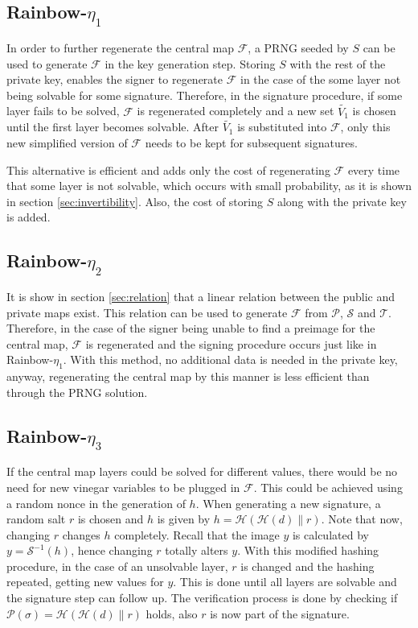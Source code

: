 \documentclass{ufsctex/ufsctex}
\begin{document}
\subsection{Rainbow-$\eta_1$}

In order to further regenerate the central map $\mathcal{F}$, a
PRNG seeded by $S$ can be used to
generate $\mathcal{F}$ in the key generation step. Storing $S$ with the rest of
the private key, enables the signer to regenerate $\mathcal{F}$ in the case of
the some layer not being solvable for some signature. Therefore, in the
signature procedure, if some layer fails to be solved, $\mathcal{F}$ is
regenerated completely and a new set $\tilde{V_1}$ is chosen until the first
layer becomes solvable. After $\tilde{V_1}$ is substituted into $\mathcal{F}$,
only this new simplified version of $\mathcal{F}$ needs to be kept for
subsequent signatures.

This alternative is efficient and adds only the cost of regenerating
$\mathcal{F}$ every time that some layer is not solvable, which occurs with
small probability, as it is shown in section \ref{sec:invertibility}. Also, the
cost of storing $S$ along with the private key is added.

\subsection{Rainbow-$\eta_2$}

It is show in section \ref{sec:relation} that a linear relation between the
public and private maps exist. This relation can be used to generate
$\mathcal{F}$ from $\mathcal{P}$, $\mathcal{S}$ and $\mathcal{T}$. Therefore,
in the case of the signer being unable to find a preimage for the central map,
$\mathcal{F}$ is regenerated and the signing procedure occurs just like in
Rainbow-$\eta_1$. With this method, no additional data is needed in the private
key, anyway, regenerating the central map by this manner is less efficient than
through the PRNG solution.

\subsection{Rainbow-$\eta_3$}\label{sec:rainboweta3}

If the central map layers could be solved for different values, there would be
no need for new vinegar variables to be plugged in $\mathcal{F}$. This could be
achieved using a random nonce in the generation of $h$. When generating a new
signature, a random salt $r$ is chosen and $h$ is given by $h =
\mathcal{H}(\mathcal{H}(d) \| r)$. Note that now, changing $r$ changes $h$
completely.  Recall that the image $y$ is calculated by $y =
\mathcal{S}^{-1}(h)$, hence changing $r$ totally alters $y$. With this modified
hashing procedure, in the case of an unsolvable layer, $r$ is changed and the
hashing repeated, getting new values for $y$. This is done until all layers are
solvable and the signature step can follow up. The verification process is done
by checking if $\mathcal{P}(\sigma) = \mathcal{H}(\mathcal{H}(d) \| r)$ holds,
also $r$ is now part of the signature.
\end{document}
